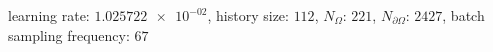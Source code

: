 learning rate: $\num[scientific-notation=true]{1.025722e-02}$, history size: $\num[scientific-notation=false]{112}$, $N_{\Omega}$: $\num[scientific-notation=false]{221}$, $N_{\partial\Omega}$: $\num[scientific-notation=false]{2427}$, batch sampling frequency: $\num[scientific-notation=false]{67}$